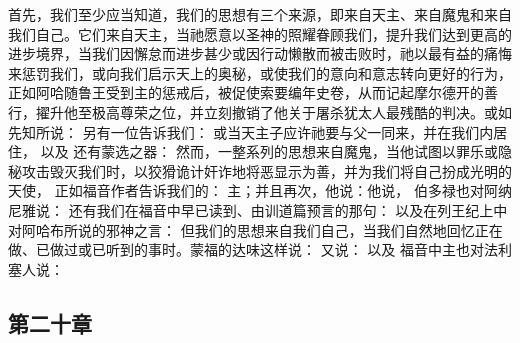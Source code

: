 首先，我们至少应当知道，我们的思想有三个来源，即来自天主、来自魔鬼和来自我们自己。它们来自天主，当祂愿意以圣神的照耀眷顾我们，提升我们达到更高的进步境界，当我们因懈怠而进步甚少或因行动懒散而被击败时，祂以最有益的痛悔来惩罚我们，或向我们启示天上的奥秘，或使我们的意向和意志转向更好的行为，正如阿哈随鲁王受到主的惩戒后，被促使索要编年史卷，从而记起摩尔德开的善行，擢升他至极高尊荣之位，并立刻撤销了他关于屠杀犹太人最残酷的判决。或如先知所说： 另有一位告诉我们：  或当天主子应许祂要与父一同来，并在我们内居住， 以及  还有蒙选之器：  然而，一整系列的思想来自魔鬼，当他试图以罪乐或隐秘攻击毁灭我们时，以狡猾诡计奸诈地将恶显示为善，并为我们将自己扮成光明的天使， 正如福音作者告诉我们的：  主；并且再次，他说：他说， 伯多禄也对阿纳尼雅说：  还有我们在福音中早已读到、由训道篇预言的那句：  以及在列王纪上中对阿哈布所说的邪神之言：  但我们的思想来自我们自己，当我们自然地回忆正在做、已做过或已听到的事时。蒙福的达味这样说： 又说： 以及  福音中主也对法利塞人说： \par


\subsection{第二十章}

\par

